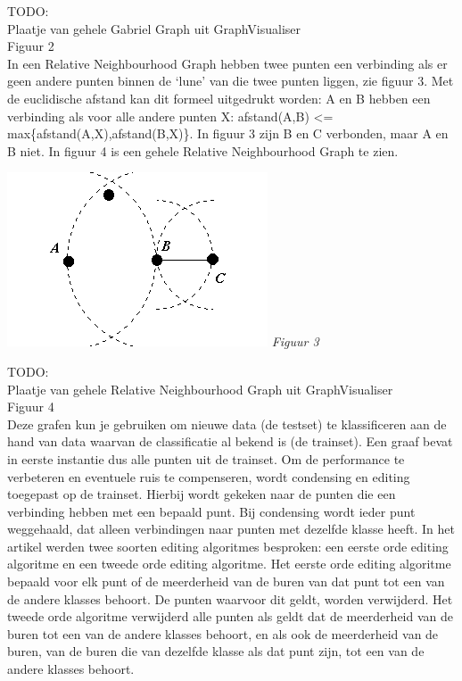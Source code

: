 \documentclass{article}
\begin{document}
TODO: \\
Plaatje van gehele Gabriel Graph uit GraphVisualiser\\
Figuur  2\\

In een Relative Neighbourhood Graph hebben twee punten een verbinding als er geen andere punten binnen de ‘lune’ van die twee punten liggen, zie figuur 3. Met de euclidische afstand kan dit formeel uitgedrukt worden: A en B hebben een verbinding als voor alle andere punten X:  afstand(A,B) <= max\{afstand(A,X),afstand(B,X)\}. In figuur 3 zijn B en C  verbonden, maar A en B niet. In figuur 4 is een gehele Relative Neighbourhood Graph te zien.\\

\begin{center} \includegraphics[keepaspectratio=true]{RNGburen} \emph{Figuur 3} \end{center}

TODO: \\
Plaatje van gehele Relative Neighbourhood Graph uit GraphVisualiser\\
Figuur 4\\

Deze grafen kun je gebruiken om nieuwe data (de testset) te klassificeren aan de hand van data waarvan de classificatie al bekend is (de trainset). Een graaf bevat in eerste instantie dus alle punten uit de trainset. Om de performance te verbeteren en eventuele ruis te compenseren, wordt condensing en editing toegepast op de trainset. Hierbij wordt gekeken naar de punten die een verbinding hebben met een bepaald punt. Bij condensing wordt ieder punt weggehaald, dat alleen verbindingen naar punten met dezelfde klasse heeft. 
In het artikel werden twee soorten editing algoritmes besproken: een eerste orde editing algoritme en een tweede orde editing algoritme. 
Het eerste orde editing algoritme bepaald voor elk punt of de meerderheid van de buren van dat punt tot een van de andere klasses behoort. De punten waarvoor dit geldt, worden verwijderd. 
Het tweede orde algoritme verwijderd alle punten als geldt dat de meerderheid van de buren tot een van de andere klasses behoort, en als ook de meerderheid van de buren, van de buren die van dezelfde klasse als dat punt zijn, tot een van de andere klasses behoort.
\end{document}
